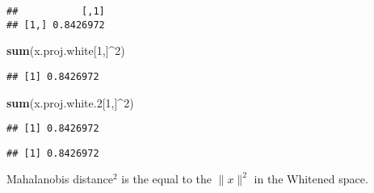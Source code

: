 \documentclass[]{article}
\newenvironment{Shaded}{\begin{snugshade}}{\end{snugshade}}
\newcommand{\KeywordTok}[1]{\textcolor[rgb]{0.13,0.29,0.53}{\textbf{{#1}}}}
\newcommand{\DecValTok}[1]{\textcolor[rgb]{0.00,0.00,0.81}{{#1}}}
\newcommand{\FloatTok}[1]{\textcolor[rgb]{0.00,0.00,0.81}{{#1}}}
\newcommand{\StringTok}[1]{\textcolor[rgb]{0.31,0.60,0.02}{{#1}}}
\newcommand{\NormalTok}[1]{{#1}}
\begin{document}
\begin{Shaded}
\end{Shaded}

\begin{verbatim}
##           [,1]
## [1,] 0.8426972
\end{verbatim}

\begin{Shaded}
\begin{Highlighting}[]
\KeywordTok{sum}\NormalTok{(x.proj.white[}\DecValTok{1}\NormalTok{,]^}\DecValTok{2}\NormalTok{)}
\end{Highlighting}
\end{Shaded}

\begin{verbatim}
## [1] 0.8426972
\end{verbatim}

\begin{Shaded}
\begin{Highlighting}[]
\KeywordTok{sum}\NormalTok{(x.proj.white}\FloatTok{.2}\NormalTok{[}\DecValTok{1}\NormalTok{,]^}\DecValTok{2}\NormalTok{)}
\end{Highlighting}
\end{Shaded}

\begin{verbatim}
## [1] 0.8426972
\end{verbatim}

\begin{Shaded}
\end{Shaded}

\begin{verbatim}
## [1] 0.8426972
\end{verbatim}

Mahalanobis distance\(^2\) is the equal to the \(\lVert x \rVert^2\) in
the Whitened space.
\end{document}

